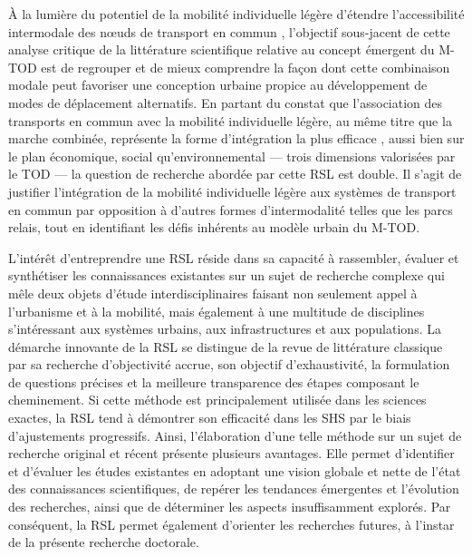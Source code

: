 \begin{refsegment}
À la lumière du potentiel de la mobilité individuelle légère d'étendre l'\gls{accessibilité intermodale} des nœuds de \gls{transport en commun} \textcolor{blue}{\autocite[118]{cottrell_transforming_2007}}, l'objectif sous-jacent de cette analyse critique de la littérature scientifique relative au concept émergent du \acrfull{M-TOD} est de regrouper et de mieux comprendre la façon dont cette combinaison modale peut favoriser une conception urbaine propice au développement de modes de déplacement alternatifs. En partant du constat que l'association des transports en commun avec la mobilité individuelle légère, au même titre que la marche combinée, représente la forme d'intégration la plus efficace \textcolor{blue}{\autocite[50]{sebban_complementarite_2003, yang_study_2013}}, aussi bien sur le plan économique, social qu'environnemental — trois dimensions valorisées par le \acrshort{TOD} \textcolor{blue}{\autocite[85]{cervero_bike-and-ride_2013}} — la question de recherche abordée par cette \acrshort{RSL} est double. Il s'agit de justifier l'intégration de la mobilité individuelle légère aux systèmes de transport en commun par opposition à d'autres formes d'intermodalité telles que les parcs relais, tout en identifiant les défis inhérents au modèle urbain du \acrshort{M-TOD}.%

L'intérêt d'entreprendre une \acrshort{RSL} réside dans sa capacité à rassembler, évaluer et synthétiser les connaissances existantes sur un sujet de recherche complexe qui mêle deux objets d'étude interdisciplinaires faisant non seulement appel à l'urbanisme et à la mobilité, mais également à une multitude de disciplines s'intéressant aux systèmes urbains, aux infrastructures et aux populations. La démarche innovante de la \acrshort{RSL} se distingue de la revue de littérature classique par sa recherche d'objectivité accrue, son objectif d'exhaustivité, la formulation de questions précises et la meilleure transparence des étapes composant le cheminement. Si cette méthode est principalement utilisée dans les sciences exactes, la \acrshort{RSL} tend à démontrer son efficacité dans les \acrfull{SHS} par le biais d'ajustements progressifs. Ainsi, l'élaboration d'une telle méthode sur un sujet de recherche original et récent présente plusieurs avantages. Elle permet d'identifier et d'évaluer les études existantes en adoptant une vision globale et nette de l'état des connaissances scientifiques, de repérer les tendances émergentes et l'évolution des recherches, ainsi que de déterminer les aspects insuffisamment explorés. Par conséquent, la \acrshort{RSL} permet également d'orienter les recherches futures, à l'instar de la présente recherche doctorale.%


\end{refsegment}

